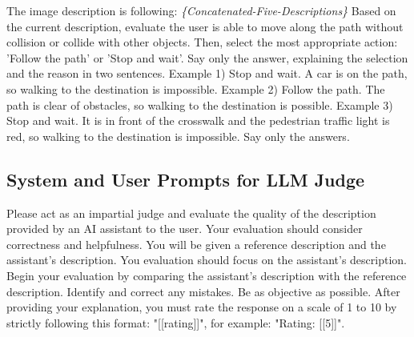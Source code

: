 \begin{tcolorbox}[
colback=orange!10!white, 
colframe=orange!50!black, 
rounded corners, 
boxrule=0.5mm, 
title=User prompt for recommendation,
width=\columnwidth]
The image description is following: \textit{\{Concatenated-Five-Descriptions\}} Based on the current description, evaluate the user is able to move along the path without collision or collide with other objects. Then, select the most appropriate action: 'Follow the path' or 'Stop and wait'. Say only the answer, explaining the selection and the reason in two sentences.  Example 1) Stop and wait. A car is on the path, so walking to the destination is impossible.  Example 2) Follow the path. The path is clear of obstacles, so walking to the destination is possible.  Example 3) Stop and wait. It is in front of the crosswalk and the pedestrian traffic light is red, so walking to the destination is impossible.  Say only the answers. 
\end{tcolorbox}


\subsection{System and User Prompts for LLM Judge}
\begin{tcolorbox}[
colback=yellow!10!white, 
colframe=yellow!50!black, 
rounded corners, 
boxrule=0.5mm, 
title=System prompt for LLM Judge,
width=\columnwidth]
Please act as an impartial judge and evaluate the quality of the description provided by an AI assistant to the user. Your evaluation should consider correctness and helpfulness. You will be given a reference description and the assistant's description. You evaluation should focus on the assistant's description. Begin your evaluation by comparing the assistant's description with the reference description. Identify and correct any mistakes. Be as objective as possible. After providing your explanation, you must rate the response on a scale of 1 to 10 by strictly following this format: "[[rating]]", for example: "Rating: [[5]]". 

\end{tcolorbox}

